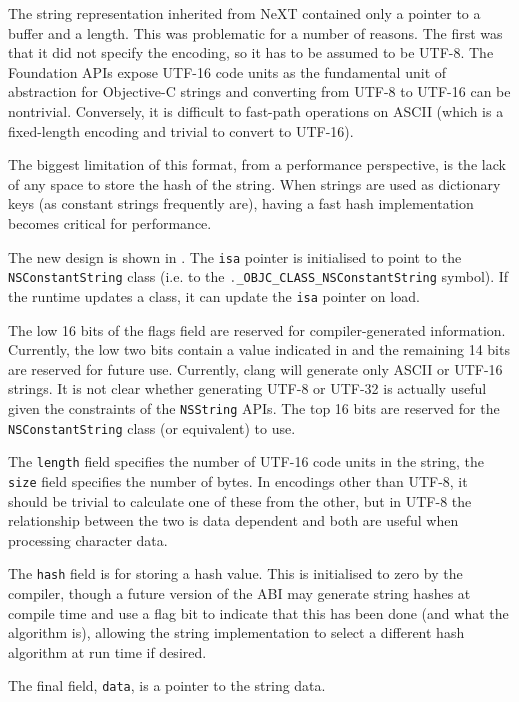 \documentclass[a4paper]{report}
\newcommand{\ccode}[1]{\lstinline[language={C}]{#1}}
\newcommand{\objc}[1]{\lstinline[language={[Objective]C}]{#1}}
\begin{document}
The string representation inherited from NeXT contained only a pointer to a buffer and a length.
This was problematic for a number of reasons.
The first was that it did not specify the encoding, so it has to be assumed to be UTF-8.
The Foundation APIs expose UTF-16 code units as the fundamental unit of abstraction for Objective-C strings and converting from UTF-8 to UTF-16 can be nontrivial.
Conversely, it is difficult to fast-path operations on ASCII (which is a fixed-length encoding and trivial to convert to UTF-16).

The biggest limitation of this format, from a performance perspective, is the lack of any space to store the hash of the string.
When strings are used as dictionary keys (as constant strings frequently are), having a fast hash implementation becomes critical for performance.

\sloppy
The new design is shown in .
The \ccode{isa} pointer is initialised to point to the \objc{NSConstantString} class (i.e. to the {\ccode{._OBJC_CLASS_NSConstantString}} symbol).
If the runtime updates a class, it can update the \ccode{isa} pointer on load.

The low 16 bits of the flags field are reserved for compiler-generated information.
Currently, the low two bits contain a value indicated in  and the remaining 14 bits are reserved for future use.
Currently, clang will generate only ASCII or UTF-16 strings.
It is not clear whether generating UTF-8 or UTF-32 is actually useful given the constraints of the \objc{NSString} APIs.
The top 16 bits are reserved for the \ccode{NSConstantString} class (or equivalent) to use.

The \ccode{length} field specifies the number of UTF-16 code units in the string, the \ccode{size} field specifies the number of bytes.
In encodings other than UTF-8, it should be trivial to calculate one of these from the other, but in UTF-8 the relationship between the two is data dependent and both are useful when processing character data.

The \ccode{hash} field is for storing a hash value.
This is initialised to zero by the compiler, though a future version of the ABI may generate string hashes at compile time and use a flag bit to indicate that this has been done (and what the algorithm is), allowing the string implementation to select a different hash algorithm at run time if desired.

The final field, \ccode{data}, is a pointer to the string data.
\end{document}
